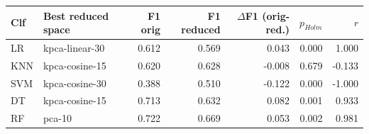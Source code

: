 \begin{tabular}{llrrrrr}
\toprule
Clf & Best reduced space & F1 orig & F1 reduced & $\Delta$F1 (orig-red.) & $p_{Holm}$ & $r$ \\
\midrule
LR & kpca-linear-30 & 0.612 & 0.569 & 0.043 & 0.000 & 1.000 \\
KNN & kpca-cosine-15 & 0.620 & 0.628 & -0.008 & 0.679 & -0.133 \\
SVM & kpca-cosine-30 & 0.388 & 0.510 & -0.122 & 0.000 & -1.000 \\
DT & kpca-cosine-15 & 0.713 & 0.632 & 0.082 & 0.001 & 0.933 \\
RF & pca-10 & 0.722 & 0.669 & 0.053 & 0.002 & 0.981 \\
\bottomrule
\end{tabular}
